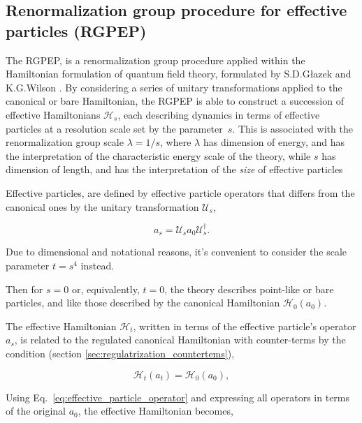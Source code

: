 \documentclass[11pt,a4paper,twoside,pdf]{article}
\numberwithin{equation}{section}
\begin{document}
\newpage

\subsection{Renormalization group procedure for effective particles (RGPEP)}
\label{sec:rgpep}
The RGPEP, is a renormalization group procedure applied within the Hamiltonian formulation 
of quantum field theory, formulated by S.D.Głazek and K.G.Wilson \cite{Glazek:1997gt,Wilson:1994fk,Glazek:1994qc,PhysRevD.48.5863}. 
By considering a series of unitary transformations applied to the
canonical or bare Hamiltonian, the RGPEP is able to construct a succession of effective 
Hamiltonians $\mathcal{H}_s$, each describing dynamics in terms of effective particles 
at a resolution scale set by the parameter~\( s \). This is associated with the 
renormalization group scale $\lambda = 1/s$, where $\lambda$ has dimension of energy,
and has the interpretation of the characteristic energy scale of the theory, 
while \( s \) has dimension of length, and has the interpretation of the 
\textit{size} of effective particles

Effective particles, are defined by effective particle 
operators that differs from the canonical ones by the unitary transformation 
$\mathcal{U}_s$,

\begin{equation}
    a_s = \mathcal{U}_sa_0\mathcal{U}_s^\dagger.
    \label{eq:effective_particle_operator}
\end{equation}

Due to dimensional and notational reasons, it's convenient to consider the scale 
parameter $t = s^4$ instead.

Then for $s=0$ or, equivalently, $t=0$, the theory describes  point-like or bare particles, 
and like those described by the canonical Hamiltonian $\mathcal{H}_0(a_0)$.

The effective Hamiltonian $\mathcal{H}_t$, written in terms of the effective particle's
operator $a_s$, is related to the regulated canonical Hamiltonian with counter-terms 
by the condition (section \ref{sec:regulatrization_countertems}),

\begin{equation}
    \mathcal{H}_t(a_t) = \mathcal{H}_0(a_0),
\end{equation}

Using Eq.~\eqref{eq:effective_particle_operator} and expressing all operators in 
terms of the original \( a_0 \), the effective Hamiltonian becomes,
\end{document}

